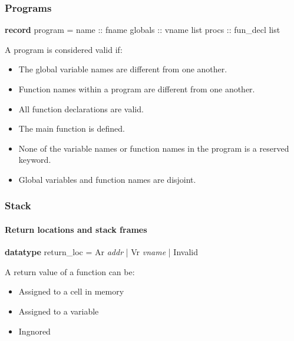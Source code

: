 \begin{frame}[fragile]
\frametitle{Programs}

\begin{semiverbatim}
\textbf{record} program =
  name :: fname
  globals :: vname list
  procs :: fun_decl list
\end{semiverbatim}
\pause

\begin{block}{A program is considered valid if:}
\begin{itemize}
\item{The global variable names are different from one another.}
\pause
\item{Function names within a program are different from one another.}
\pause
\item{All function declarations are valid.}
\pause
\item{The main function is defined.}
\pause
\item{None of the variable names or function names in the program is a reserved keyword.}
\pause
\item{Global variables and function names are disjoint.}
\end{itemize}
\end{block}


\end{frame}


\begin{frame}[fragile]
\frametitle{Stack}
\framesubtitle{Return locations and stack frames}

\begin{semiverbatim}
\textbf{datatype} return_loc = \alert<3>{Ar \textit{addr}} | \alert<4>{Vr \textit{vname}} | \alert<5>{Invalid}
\end{semiverbatim}

\pause

A return value of a function can be:
\begin{itemize}
\item<3->{\alert<3>{Assigned to a cell in memory}}
\item<4->{\alert<4>{Assigned to a variable}}
\item<5->{\alert<5>{Ingnored}}
\end{itemize}


\bigskip
{}

\bigskip



\end{frame}



